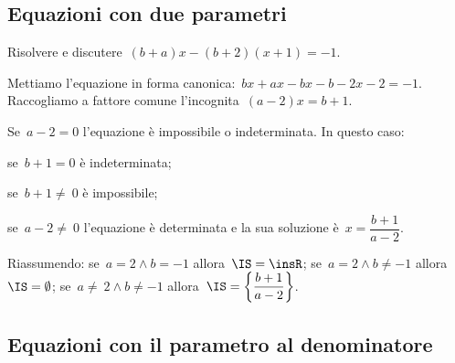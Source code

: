 \ovalbox{\risolvii \ref{ese:17.38}, \ref{ese:17.39}, \ref{ese:17.40}, \ref{ese:17.41}, \ref{ese:17.42}, \ref{ese:17.43}, \ref{ese:17.44}}

\subsection{Equazioni con due parametri}

\begin{exrig}
 \begin{esempio}
Risolvere e discutere~$(b+a)x-(b+2)(x+1)=-1$.

Mettiamo l'equazione in forma canonica:~$bx+ax-bx-b-2x-2=-1$.
Raccogliamo a fattore comune l'incognita~$(a-2)x=b+1$.
\begin{itemize*}
 \item Se~$a-2=0$ l'equazione è impossibile o indeterminata. In questo caso:
  \begin{itemize*}
   \item se~$b+1=0$ è indeterminata;
   \item se~$b+1\neq~0$ è impossibile;
  \end{itemize*}
 \item se~$a-2\neq~0$ l'equazione è determinata e la sua soluzione è~$x=\dfrac{b+1}{a-2}$.
\end{itemize*}
 \end{esempio}
Riassumendo:
se~$a=2\wedge b=-1$ allora~$\IS=\insR$; se~$a=2\wedge b\neq -1$ allora~$\IS=\emptyset$; se~$a\neq~2\wedge b\neq -1$ allora~$\IS=\left\{\dfrac{b+1}{a-2}\right\}$.
\end{exrig}

\ovalbox{\risolvii \ref{ese:17.45}, \ref{ese:17.46}, \ref{ese:17.47}}

\subsection{Equazioni con il parametro al denominatore}

